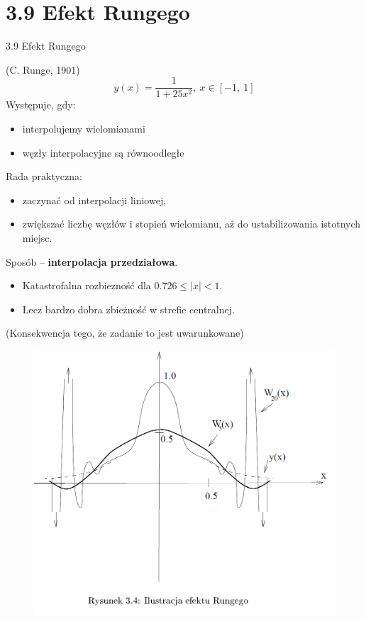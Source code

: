 \section{3.9 Efekt Rungego}
\begin{frame}
{3.9 Efekt Rungego}

(C. Runge, 1901)
$$
y(x)=\frac{1}{1+25x^{2}},\ x\in[-1,\ 1]
$$
Występuje, gdy:
\begin{itemize}
\item interpolujemy wielomianami

\item węzły interpolacyjne są równoodległe
\end{itemize}

Rada praktyczna:

\begin{itemize}
\item zaczynać od interpolacji liniowej,

\item zwiększać liczbę węzłów i stopień wielomianu, aż do ustabilizowania istotnych miejsc.
\end{itemize}


Sposób -- \textbf{interpolacja przedziałowa}.
\begin{itemize}
\item Katastrofalna rozbiezność dla $0.726\leq|x|<1$.

\item Lecz bardzo dobra zbieżność w strefie centralnej.
\end{itemize}

(Konsekwencja tego, że zadanie to jest { uwarunkowane})
\end{frame}
\begin{frame}
\begin{figure}[h]
			\includegraphics[scale=0.35]{img/3/interpol_3_9}
	\end{figure}
\end{frame}
